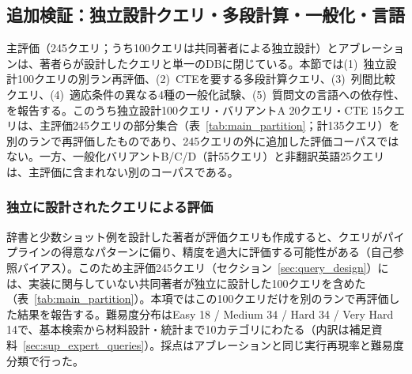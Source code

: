 \documentclass[twocolumn]{interact}
\begin{document}
\subsection{追加検証：独立設計クエリ・多段計算・一般化・言語}
\label{sec:additional_validation}

主評価（245クエリ；うち100クエリは共同著者による独立設計）とアブレーションは、著者らが設計したクエリと単一のDBに閉じている。本節では(1)~独立設計100クエリの別ラン再評価、(2)~CTEを要する多段計算クエリ、(3)~列間比較クエリ、(4)~適応条件の異なる4種の一般化試験、(5)~質問文の言語への依存性、を報告する。このうち独立設計100クエリ・バリアントA 20クエリ・CTE 15クエリは、主評価245クエリの部分集合（表~\ref{tab:main_partition}；計135クエリ）を別のランで再評価したものであり、245クエリの外に追加した評価コーパスではない。一方、一般化バリアントB/C/D（計55クエリ）と非翻訳英語25クエリは、主評価に含まれない別のコーパスである。

\subsubsection{独立に設計されたクエリによる評価}
\label{sec:independent_eval}

辞書と少数ショット例を設計した著者が評価クエリも作成すると、クエリがパイプラインの得意なパターンに偏り、精度を過大に評価する可能性がある（自己参照バイアス）。このため主評価245クエリ（セクション~\ref{sec:query_design}）には、実装に関与していない共同著者が独立に設計した100クエリを含めた（表~\ref{tab:main_partition}）。本項ではこの100クエリだけを別のランで再評価した結果を報告する。難易度分布はEasy 18 / Medium 34 / Hard 34 / Very Hard 14で、基本検索から材料設計・統計まで10カテゴリにわたる（内訳は補足資料~\ref{sec:sup_expert_queries}）。採点はアブレーションと同じ実行再現率と難易度分類で行った。
\end{document}
